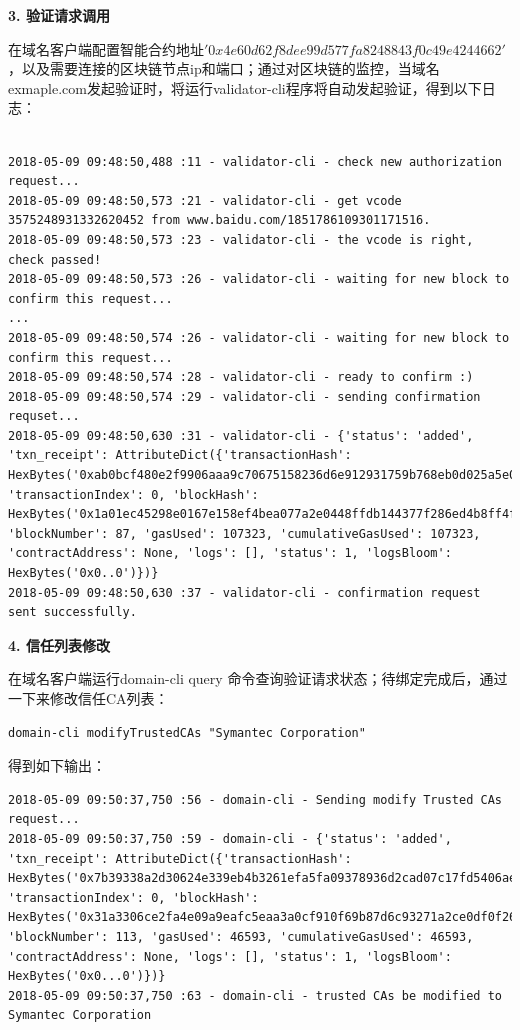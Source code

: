 \noindent\textbf{3. 验证请求调用}

在域名客户端配置智能合约地址$'0x4e60d62f8dee99d577fa8248843f0c49e4244662'$，以及需要连接的区块链节点ip和端口；通过对区块链的监控，当域名exmaple.com发起验证时，将运行validator-cli程序将自动发起验证，得到以下日志：

\begin{lstlisting}

2018-05-09 09:48:50,488 :11 - validator-cli - check new authorization request...
2018-05-09 09:48:50,573 :21 - validator-cli - get vcode 3575248931332620452 from www.baidu.com/1851786109301171516.
2018-05-09 09:48:50,573 :23 - validator-cli - the vcode is right, check passed!
2018-05-09 09:48:50,573 :26 - validator-cli - waiting for new block to confirm this request...
...
2018-05-09 09:48:50,574 :26 - validator-cli - waiting for new block to confirm this request...
2018-05-09 09:48:50,574 :28 - validator-cli - ready to confirm :)
2018-05-09 09:48:50,574 :29 - validator-cli - sending confirmation requset...
2018-05-09 09:48:50,630 :31 - validator-cli - {'status': 'added', 'txn_receipt': AttributeDict({'transactionHash': HexBytes('0xab0bcf480e2f9906aaa9c70675158236d6e912931759b768eb0d025a5e0c20d7'), 'transactionIndex': 0, 'blockHash': HexBytes('0x1a01ec45298e0167e158ef4bea077a2e0448ffdb144377f286ed4b8ff4f3c77a'), 'blockNumber': 87, 'gasUsed': 107323, 'cumulativeGasUsed': 107323, 'contractAddress': None, 'logs': [], 'status': 1, 'logsBloom': HexBytes('0x0..0')})}
2018-05-09 09:48:50,630 :37 - validator-cli - confirmation request sent successfully.

\end{lstlisting}


\noindent\textbf{4. 信任列表修改}

在域名客户端运行domain-cli query 命令查询验证请求状态；待绑定完成后，通过一下来修改信任CA列表：

\begin{lstlisting}
domain-cli modifyTrustedCAs "Symantec Corporation" 
\end{lstlisting}


得到如下输出：

\begin{lstlisting}
2018-05-09 09:50:37,750 :56 - domain-cli - Sending modify Trusted CAs request...
2018-05-09 09:50:37,750 :59 - domain-cli - {'status': 'added', 'txn_receipt': AttributeDict({'transactionHash': HexBytes('0x7b39338a2d30624e339eb4b3261efa5fa09378936d2cad07c17fd5406ae40729'), 'transactionIndex': 0, 'blockHash': HexBytes('0x31a3306ce2fa4e09a9eafc5eaa3a0cf910f69b87d6c93271a2ce0df0f26b955f'), 'blockNumber': 113, 'gasUsed': 46593, 'cumulativeGasUsed': 46593, 'contractAddress': None, 'logs': [], 'status': 1, 'logsBloom': HexBytes('0x0...0')})}
2018-05-09 09:50:37,750 :63 - domain-cli - trusted CAs be modified to Symantec Corporation
\end{lstlisting}


